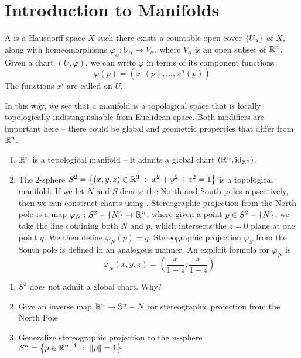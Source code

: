 \section{Introduction to Manifolds}
%
\begin{defn}
A  is a Hausdorff space $X$ such there exists a countable open cover $\left\lbrace U_\alpha \right\rbrace$
of $X$, along with homeomorphisms $\varphi_\alpha : U_\alpha \to V_\alpha$, where $V_\alpha$ is an open subset
of $\mathbb{R}^n$. Given a chart $(U, \varphi)$, we can write $\varphi$ in terms of its component functions
$$\varphi(p) = (x^1(p), \ldots, x^n(p)) $$
The functions $x^i$ are called  on $U$.
\end{defn}
%
In this way, we see that a manifold is a topological space that is locally topologically indistinguishable from
Euclidean space. Both modifiers are important here -- there could be global and geometric properties that
differ from $\mathbb{R}^n$.
%
\begin{exmp}\enumbreak
	\begin{enumerate}
		\item $\mathbb{R}^n$ is a topological manifold -- it admits a global chart $(\mathbb{R}^n, \operatorname{id}_{\mathbb{R}^n})$.
		\item The $2$-sphere $S^2 = \left\lbrace (x,y,z) \in \mathbb{R}^3 ~:~ x^2 + y^2 + z^2 = 1 \right\rbrace$ is a topological
		manifold. If we let $N$ and $S$ denote the North and South poles repsectively, then we can
		construct charts using . Stereographic projection from the North
		pole is a map $\varphi_N : S^2 - \left\lbrace N \right\rbrace \to \mathbb{R}^n$, where given a point $p \in S^2 - \left\lbrace N \right\rbrace$,
		we take the line cotaining both $N$ and $p$, which intersects the $z = 0 $ plane at one point
		$q$. We then define $\varphi_N(p) = q$. Stereographic projection $\varphi_S$ from the South
		pole is defined in an analogous manner. An explicit formula for $\varphi_N$ is
		$$\varphi_N(x,y,z) = \left(\frac{x}{1 - z}, \frac{x}{1 - z} \right) $$
	\end{enumerate}
\end{exmp}
%
\begin{exer}\enumbreak
	\begin{enumerate}
		\item $S^2$ does not admit a global chart. Why?
		\item Give an inverse map $\mathbb{R}^n \to \mathbb{S}^n - {N}$ for stereographic projection from the
			North Pole
		\item Generalize stereographic projection to the $n$-sphere
		$S^n = \left\lbrace p \in \mathbb{R}^{n+1} ~:~ \left\lVert p\right\rVert = 1 \right\rbrace$
	\end{enumerate}
\end{exer}
